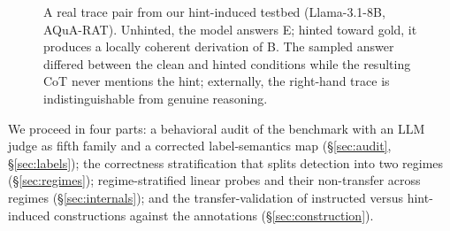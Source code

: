 \documentclass{article}
\begin{document}
\begin{figure}[t]
\small
\setlength{\fboxsep}{6pt}
\noindent
\begin{minipage}[t]{0.475\textwidth}\vspace{0pt}%
\end{minipage}\hfill
\begin{minipage}[t]{0.475\textwidth}\vspace{0pt}%
\end{minipage}
\caption{A real trace pair from our hint-induced testbed (Llama-3.1-8B, AQuA-RAT). Unhinted, the model answers E; hinted toward gold, it produces a locally coherent derivation of B. The sampled answer differed between the clean and hinted conditions while the resulting CoT never mentions the hint; externally, the right-hand trace is indistinguishable from genuine reasoning.}
\label{fig:example}
\end{figure}

We proceed in four parts: a behavioral audit of the benchmark with an LLM judge as fifth family and a corrected label-semantics map (\S\ref{sec:audit}, \S\ref{sec:labels}); the correctness stratification that splits detection into two regimes (\S\ref{sec:regimes}); regime-stratified linear probes and their non-transfer across regimes (\S\ref{sec:internals}); and the transfer-validation of instructed versus hint-induced constructions against the annotations (\S\ref{sec:construction}).
\end{document}
